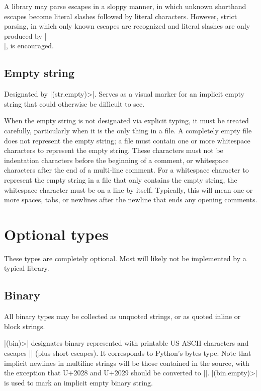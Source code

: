 \documentclass[11pt]{article}
\begin{document}
A library may parse escapes in a sloppy manner, in which unknown shorthand escapes become literal slashes followed by literal characters.  However, strict parsing, in which only known escapes are recognized and literal slashes are only produced by |\\|, is encouraged.

\subsection{Empty string}

Designated by |(str.empty)>|.  Serves as a visual marker for an implicit empty string that could otherwise be difficult to see.

When the empty string is not designated via explicit typing, it must be treated carefully, particularly when it is the only thing in a file.  A completely empty file does not represent the empty string; a file must contain one or more whitespace characters to represent the empty string.  These characters must not be indentation characters before the beginning of a comment, or whitespace characters after the end of a multi-line comment.  For a whitespace character to represent the empty string in a file that only contains the empty string, the whitespace character must be on a line by itself.  Typically, this will mean one or more spaces, tabs, or newlines after the newline that ends any opening comments.





\section{Optional types}

These types are completely optional.  Most will likely not be implemented by a typical library.

\subsection{Binary}

All binary types may be collected as unquoted strings, or as quoted inline or block strings.  

|(bin)>| designates binary represented with printable US ASCII characters and escapes |\xHH| (plus short escapes).  It corresponds to Python's bytes type.  Note that implicit newlines in multiline strings will be those contained in the source, with the exception that U+2028 and U+2029 should be converted to |\n|.  |(bin.empty)>| is used to mark an implicit empty binary string.
\end{document}
